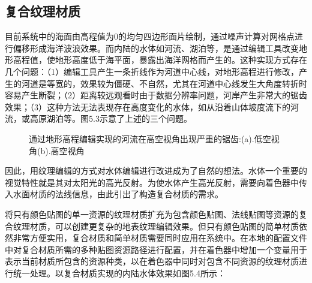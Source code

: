 \subsection{复合纹理材质}
目前系统中的海面由高程值为0的均匀四边形面片绘制，通过噪声计算对网格点进行偏移形成海洋波浪效果。而内陆的水体如河流、湖泊等，是通过编辑工具改变地形高程值，使地形高度低于海平面，暴露出海洋网格而产生的。这种实现方式存在几个问题：（1）编辑工具产生一条折线作为河道中心线，对地形高程进行修改，产生的河道是等宽的，效果较为僵硬、不自然，尤其在河道中心线发生大角度转折时容易产生断裂；（2）距离较远观看时由于数据分辨率问题，河岸产生非常大的锯齿效果；（3）这种方法无法表现存在高度变化的水体，如从沿着山体坡度流下的河流，或高原湖泊等。图5.3示意了上述的三个问题。
\begin{figure}[htb]
    \centering
    \caption{通过地形高程编辑实现的河流在高空视角出现严重的锯齿:(a).低空视角(b).高空视角}
\end{figure}
因此，用纹理编辑的方式对水体编辑进行改进成为了自然的想法。水体一个重要的视觉特性就是其对太阳光的高光反射。为使水体产生高光反射，需要向着色器中传入水面材质的法线信息，由此引出了构造复合材质的需求。\par
将只有颜色贴图的单一资源的纹理材质扩充为包含颜色贴图、法线贴图等资源的复合纹理材质，可以创建更复杂的地表纹理编辑效果。但只有颜色贴图的简单材质依然非常方便实用，复合材质和简单材质需要同时应用在系统中。在本地的配置文件中对复合材质所需的多种贴图资源路径进行配置，并在着色器中增加一个变量用于表示当前材质所包含的资源种类，以在着色器中同时对包含不同资源的纹理材质进行统一处理。以复合材质实现的内陆水体效果如图5.4所示：
